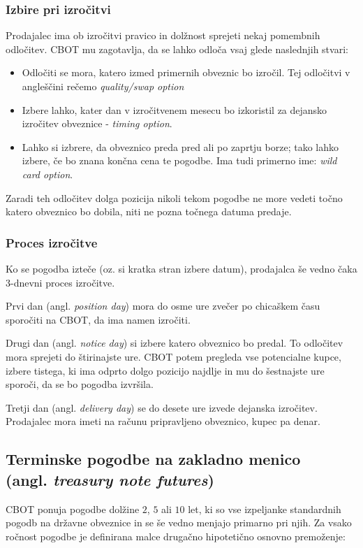\documentclass[a4paper]{article}
\begin{document}

\subsubsection{Izbire pri izročitvi}
Prodajalec ima ob izročitvi pravico in dolžnost sprejeti nekaj pomembnih odločitev. CBOT mu 
zagotavlja, da se lahko odloča vsaj glede naslednjih stvari:

\begin{itemize}
    \item Odločiti se mora, katero izmed primernih obveznic bo izročil. Tej odločitvi v angleščini 
            rečemo \textit{quality/swap option}
    \item Izbere lahko, kater dan v izročitvenem mesecu bo izkoristil za dejansko izročitev
            obveznice - \textit{timing option}.
    \item Lahko si izbrere, da obveznico preda pred ali po zaprtju borze; tako lahko izbere, če 
            bo znana končna cena te pogodbe. Ima tudi primerno ime: \textit{wild card option}. 
\end{itemize}

Zaradi teh odločitev dolga pozicija nikoli tekom pogodbe ne more vedeti točno katero obveznico bo
dobila, niti ne pozna točnega datuma predaje.

\subsubsection{Proces izročitve}
Ko se pogodba izteče (oz. si kratka stran izbere datum), prodajalca še vedno čaka 3-dnevni proces 
izročitve. 

Prvi dan (angl. \textit{position day}) mora do osme ure zvečer po chicaškem času sporočiti na 
CBOT, da ima namen izročiti. 

Drugi dan (angl. \textit{notice day}) si izbere katero obveznico bo predal. To odločitev mora 
sprejeti do štirinajste ure. CBOT potem pregleda vse potencialne kupce, izbere tistega, ki 
ima odprto dolgo pozicijo najdlje in mu do šestnajste ure sporoči, da se bo pogodba izvršila. 

Tretji dan (angl. \textit{delivery day}) se do desete ure izvede dejanska izročitev. Prodajalec 
mora imeti na računu pripravljeno obveznico, kupec pa denar. 


\subsection{Terminske pogodbe na zakladno menico \\ (angl. \textit{treasury note futures})}
CBOT ponuja pogodbe dolžine $2$, $5$ ali $10$ let, ki so vse izpeljanke standardnih pogodb na 
državne obveznice in se še vedno menjajo primarno pri njih. Za vsako ročnost pogodbe je 
definirana malce drugačno hipotetično osnovno premoženje:
\end{document}
